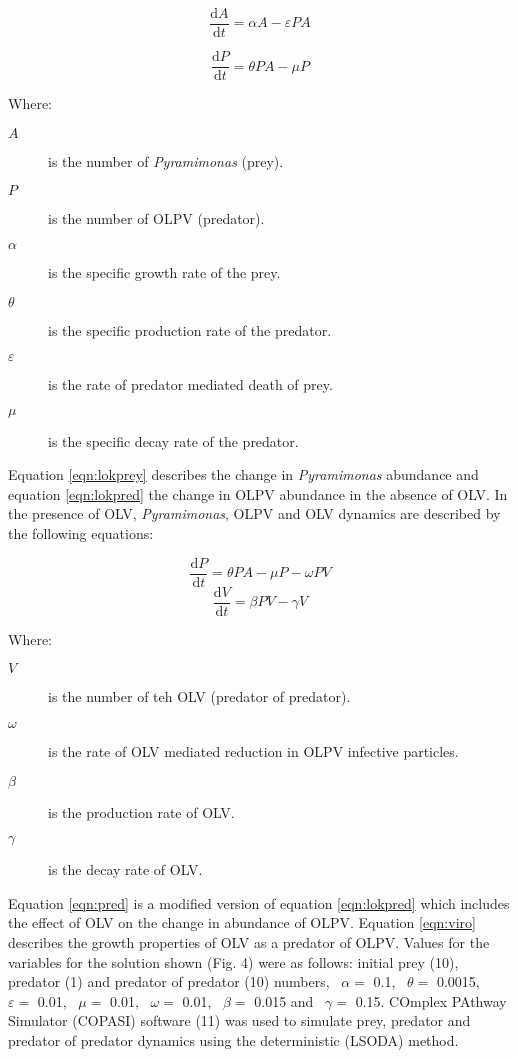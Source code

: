 \begin{equation}
\frac{\mathrm{d}A}{\mathrm{d}t}=\alpha A - \varepsilon PA
\label{eqn:lokprey}
\end{equation}

\begin{equation}
\frac{\mathrm{d}P}{\mathrm{d}t}= \theta PA - \mu P
\label{eqn:lokpred}
\end{equation}

Where:
\begin{description}
\item[$A$] is the number of \textit{Pyramimonas} (prey).
\item[$P$] is the number of OLPV (predator).
\item[$\alpha$] is the specific growth rate of the prey.
\item[$\theta$] is the specific production rate of the predator.
\item[$\varepsilon$] is the rate of predator mediated death of prey.
\item[$\mu$] is the specific decay rate of the predator.
\end{description}

Equation \ref{eqn:lokprey} describes the change in \textit{Pyramimonas} abundance and equation \ref{eqn:lokpred} the change in OLPV abundance in the absence of OLV.
In the presence of OLV, \textit{Pyramimonas}, OLPV and OLV dynamics are described by the following equations:

\begin{equation}
\frac{\mathrm{d}P}{\mathrm{d}t}= \theta PA - \mu P - \omega PV
\label{eqn:pred}
\end{equation}
\begin{equation}
\frac{\mathrm{d}V}{\mathrm{d}t}=\beta PV - \gamma V
\label{eqn:viro}
\end{equation}

Where:
\begin{description}
\item[$V$] is the number of teh OLV (predator of predator).
\item[$\omega$] is the rate of OLV mediated reduction in OLPV infective particles.
\item[$\beta$] is the production rate of OLV.
\item[$\gamma$] is the decay rate of OLV.
\end{description}

Equation \ref{eqn:pred} is a modified version of equation \ref{eqn:lokpred} which includes the effect of OLV on the change in abundance of OLPV.
Equation \ref{eqn:viro} describes the growth properties of OLV as a predator of OLPV.
Values for the variables for the solution shown (Fig. 4) were as follows: initial prey (10), predator (1) and predator of predator (10) numbers, ~$\alpha=$ 0.1, ~$\theta=$ 0.0015, ~$\varepsilon=$ 0.01, ~$\mu=$ 0.01, ~$\omega=$ 0.01, ~$\beta=$ 0.015 and ~$\gamma=$ 0.15. 
COmplex PAthway Simulator (COPASI) software (11) was used to simulate prey, predator and predator of predator dynamics using the deterministic (LSODA) method.


